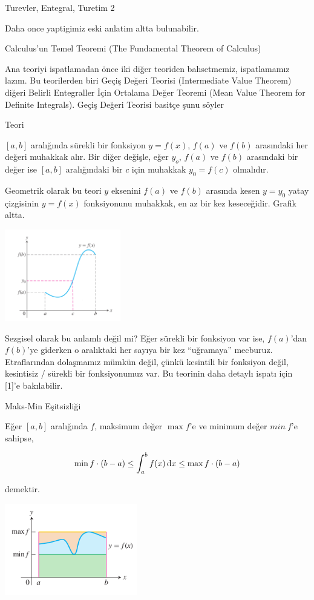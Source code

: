 \documentclass[12pt,fleqn]{article}\usepackage{../../common}
\begin{document}
Turevler, Entegral, Turetim 2

Daha once yaptigimiz eski anlatim altta bulunabilir.

Calculus'un Temel Teoremi (The Fundamental Theorem of Calculus)

Ana teoriyi ispatlamadan önce iki diğer teoriden bahsetmemiz, ispatlamamız
lazım. Bu teorilerden biri Geçiş Değeri Teorisi (Intermediate Value
Theorem) diğeri Belirli Entegraller İçin Ortalama Değer Teoremi (Mean Value
Theorem for Definite Integrals). Geçiş Değeri Teorisi basitçe şunu söyler

Teori

$[a,b]$ aralığında sürekli bir fonksiyon $y=f(x)$, $f(a)$ ve $f(b)$
arasındaki her değeri muhakkak alır. Bir diğer değişle, eğer $y_o$, $f(a)$
ve $f(b)$ arasındaki bir değer ise $[a,b]$ aralığındaki bir $c$ için
muhakkak $y_0 = f(c)$ olmalıdır. 

Geometrik olarak bu teori $y$ eksenini $f(a)$ ve $f(b)$ arasında kesen
$y=y_0$ yatay çizgisinin $y=f(x)$ fonksiyonunu muhakkak, en az bir kez
keseceğidir. Grafik altta. 

\includegraphics[height=4cm]{calc_multi_app_05.png}

Sezgisel olarak bu anlamlı değil mi? Eğer sürekli bir fonksiyon var ise,
$f(a)$'dan $f(b)$'ye giderken o aralıktaki her sayıya bir kez ``uğramaya''
mecburuz. Etraflarından dolaşmamız mümkün değil, çünkü kesintili bir
fonksiyon değil, kesintisiz / sürekli bir fonksiyonumuz var. Bu teorinin
daha detaylı ispatı için [1]'e bakılabilir. 

Maks-Min Eşitsizliği

Eğer $[a,b]$ aralığında $f$, maksimum değer $\max f$'e ve minimum değer
$min \ f$'e sahipse, 

$$ \min f \cdot (b-a) \le \int_a^b f(x) \,\mathrm{d} x \le \max f \cdot (b-a) $$

demektir. 

\includegraphics[height=4cm]{calc_multi_app_08.png}
\end{document}
